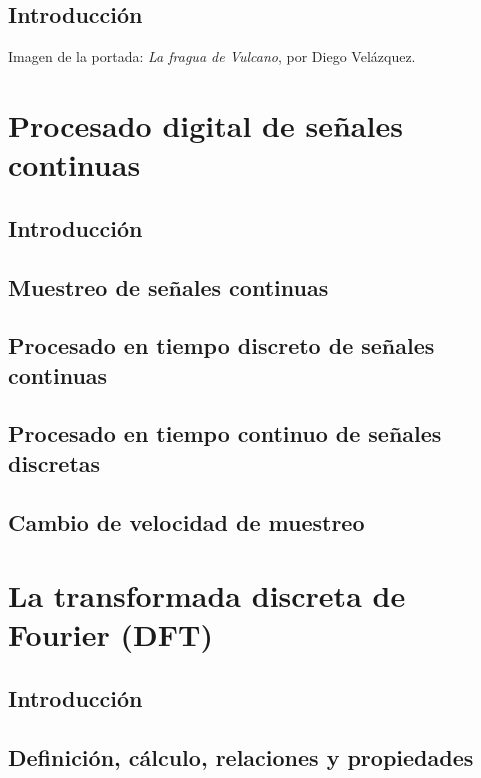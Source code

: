 \documentclass[a4paper]{book}
\numberwithin{figure}{chapter}
\numberwithin{equation}{chapter}
\begin{document}
\begin{figure}[t!]
\begin{subfigure}[b]{0.25\linewidth}
	\end{subfigure}
\end{figure}


\newpage


\section*{Introducción}
Imagen de la portada: \textsl{La fragua de Vulcano}, por Diego Velázquez.


\newpage

\setlength{\parskip}{0em}
\tableofcontents 
\setlength{\parskip}{0.5em}

\chapter{Procesado digital de señales continuas}
\section{Introducción}
\section{Muestreo de señales continuas}
\section{Procesado en tiempo discreto de señales continuas}
\section{Procesado en tiempo continuo de señales discretas}
\section{Cambio de velocidad de muestreo}

\chapter{La transformada discreta de Fourier (DFT)}
\section{Introducción}
\section{Definición, cálculo, relaciones y propiedades}
\end{document}
